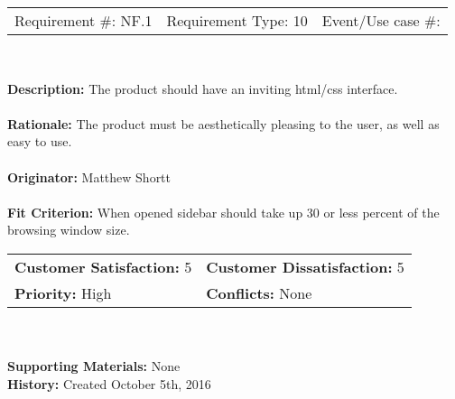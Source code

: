 \documentclass[12pt, titlepage]{article}
\begin{document}
\begin{framed}

	\begin{center}
		
		\begin{tabular}{ l c r }
			Requirement \#: NF.1 & Requirement Type: 10 & Event/Use case \#: \\
		\end{tabular} \\
	\end{center}
	\textbf{Description:} The product should have an inviting html/css interface.\\
	\\
	\textbf{Rationale:} The product must be aesthetically pleasing to the user, as well as 
	easy 
	to use.  \\
	\\
	\textbf{Originator:} Matthew Shortt \\
	\\
	\textbf{Fit Criterion:} When opened sidebar should take up 30 or less percent of the 
	browsing window size.   
	\\

	\begin{tabular}{ll}
		\textbf{Customer Satisfaction:} 5 & \textbf{Customer Dissatisfaction:} 5 \\
		\textbf{Priority:} High & \textbf{Conflicts:} None\\
	\end{tabular} \\
	\\
	\textbf{Supporting Materials:} None \\
	\textbf{History:} Created October 5th, 2016

\end{framed}
\end{document}
